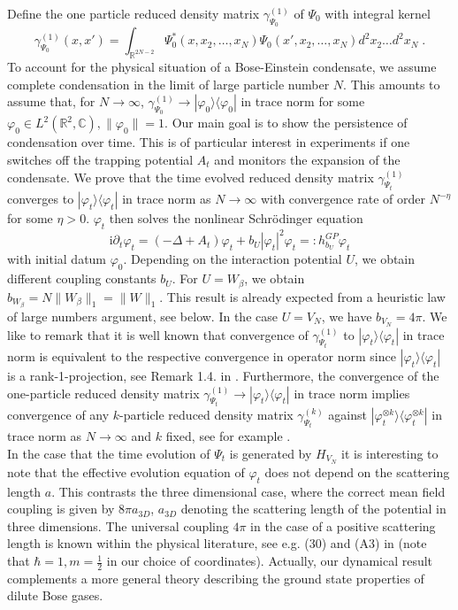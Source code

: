 \documentclass[11pt, english, american]{article}
\newcommand{\be}{\begin{equation}}
\newcommand{\ee}{\end{equation}}
\newcommand{\im}{\text{i}}
\renewcommand{\phi}{\varphi}
\begin{document}
Define the one particle reduced density matrix $\gamma^{(1)}_{\Psi_0}$ of $\Psi_0$ with integral kernel
$$\gamma^{(1)}_{\Psi_0}(x,x')=\int_{\mathbb{R}^{2N-2}} \Psi_{0}^*(x,x_2,\ldots,x_N)\Psi_{0}(x',x_2,\ldots,x_N)d^2x_2\ldots d^2x_N \;. $$
To account for the physical situation of a Bose-Einstein condensate, we assume complete condensation in the limit of large particle number $N$. This amounts to
assume that, for $N \rightarrow \infty$,
 $\gamma^{(1)}_{\Psi_0}  \rightarrow |\phi_0\rangle\langle\phi_0|$ in trace norm for some $\phi_0
\in L^2(\mathbb{R}^2,\mathbb{C}) 
  , \|\phi_0\|=1$.
 Our main goal is to show the persistence of condensation over time. 
  This is of particular interest in experiments if one switches off the trapping potential $A_t$ and monitors the expansion of the condensate.
We prove that the time evolved reduced density matrix $\gamma^{(1)}_{\Psi_t}$
 converges to $ |\phi_t\rangle\langle\phi_t|$ in trace norm as $N \rightarrow \infty$ with convergence rate of order $N^{-\eta}$ for some $\eta>0$. 
 $\phi_t$ then solves  the nonlinear Schr\"odinger equation
\be\label{GP} \im \partial_t
\phi_t=\left(-\Delta +A_t\right) \phi_t+
b_U
|\phi_t|^2\phi_t=:h_{ b_U}^{GP}\phi_t
\ee
with initial datum $\phi_0$. Depending on the interaction potential $U$, we obtain different coupling constants $b_U$.
For $U=W_\beta$, we obtain $b_{W_\beta}= N\|W_\beta\|_1= \|W\|_1$. This result is already expected from a heuristic law of large numbers argument, see below.
In the case $U= V_N$, we have $b_{V_N}= 4\pi$.
We like to remark that it is well known that convergence of $\gamma^{(1)}_{\Psi_t}$
 to $ |\phi_t\rangle\langle\phi_t|$ in trace norm is equivalent to the respective convergence in operator norm since $|\phi_t\rangle\langle\phi_t|$ is a rank-1-projection, see
Remark 1.4. in \cite{rodnianskischlein}. Furthermore, the convergence of the one-particle reduced density matrix
$\gamma^{(1)}_{\Psi_t} \rightarrow| \phi_t \rangle \langle \phi_t |$ in trace norm
 implies convergence of any $k$-particle reduced density matrix $\gamma^{(k)}_{\Psi_t}$ against $| \phi_t^{\otimes k} \rangle \langle \phi_t^{\otimes k} |$ in trace norm as $N \rightarrow \infty$ and $k$ fixed, see for example \cite{knowles}.
\medskip\\
In the case that the time evolution of $\Psi_t$ is generated by $H_{V_N}$
it is interesting to note that the effective evolution equation of $\phi_t$ does not depend on the scattering length $a$. This contrasts the three dimensional case, where the correct mean field coupling is  given by  $ 8 \pi a_{3D}$, $a_{3D}$ denoting the scattering length of the potential in three dimensions. The universal coupling $4 \pi$ in the case of a positive scattering length is known within the physical literature, see e.g. (30) and (A3) in \cite{cherny} (note that $\hbar=1, m= \frac{1}{2}$ in our choice of coordinates). Actually, our dynamical result complements a more general theory describing the ground state properties of dilute Bose gases. 
\end{document}
